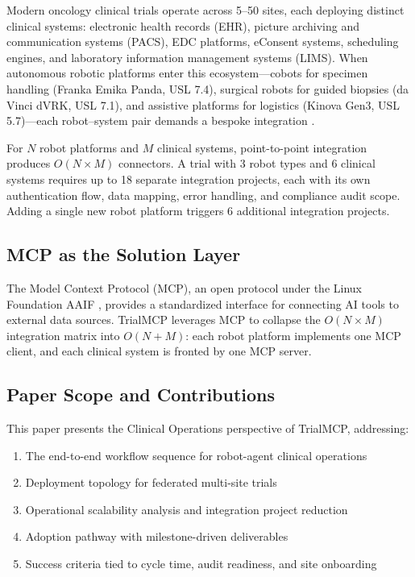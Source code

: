 \documentclass[10pt,letterpaper]{article}
\begin{document}
Modern oncology clinical trials operate across 5--50 sites, each deploying distinct clinical systems: electronic health records (EHR), picture archiving and communication systems (PACS), EDC platforms, eConsent systems, scheduling engines, and laboratory information management systems (LIMS). When autonomous robotic platforms enter this ecosystem---cobots for specimen handling (Franka Emika Panda, USL 7.4), surgical robots for guided biopsies (da Vinci dVRK, USL 7.1), and assistive platforms for logistics (Kinova Gen3, USL 5.7)---each robot--system pair demands a bespoke integration \cite{kawchak2026pai}.

For $N$ robot platforms and $M$ clinical systems, point-to-point integration produces $O(N \times M)$ connectors. A trial with 3 robot types and 6 clinical systems requires up to 18 separate integration projects, each with its own authentication flow, data mapping, error handling, and compliance audit scope. Adding a single new robot platform triggers 6 additional integration projects.

\subsection{MCP as the Solution Layer}

The Model Context Protocol (MCP), an open protocol under the Linux Foundation AAIF \cite{mcp2025spec}, provides a standardized interface for connecting AI tools to external data sources. TrialMCP leverages MCP to collapse the $O(N \times M)$ integration matrix into $O(N + M)$: each robot platform implements one MCP client, and each clinical system is fronted by one MCP server.

\subsection{Paper Scope and Contributions}

This paper presents the Clinical Operations perspective of TrialMCP, addressing:

\begin{enumerate}[leftmargin=2em]
    \item The end-to-end workflow sequence for robot-agent clinical operations
    \item Deployment topology for federated multi-site trials
    \item Operational scalability analysis and integration project reduction
    \item Adoption pathway with milestone-driven deliverables
    \item Success criteria tied to cycle time, audit readiness, and site onboarding
\end{enumerate}
\end{document}
